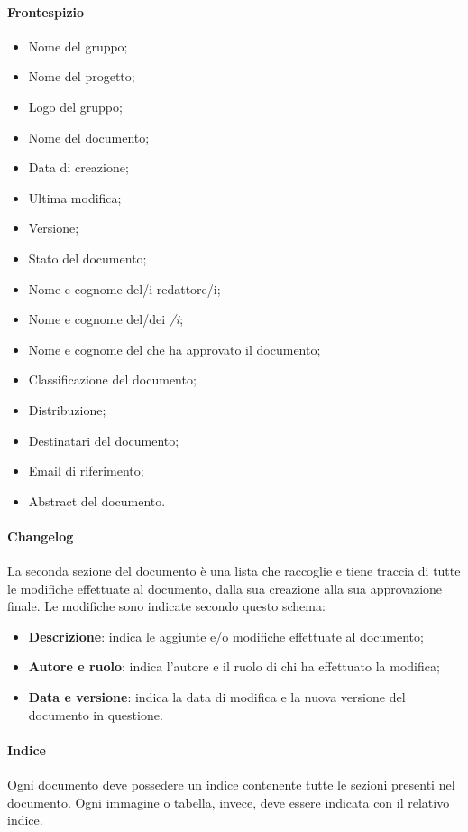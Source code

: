 			\paragraph{Frontespizio}
			\begin{itemize}
				\item{Nome del gruppo;}
				\item{Nome del progetto;}
				\item{Logo del gruppo;}
				\item{Nome del documento;}
				\item{Data di creazione;}
				\item{Ultima modifica;}
				\item{Versione;}
				\item{Stato del documento;}
				\item{Nome e cognome del/i redattore/i;}
				\item{Nome e cognome del/dei \textit{\Ver/i};}
				\item{Nome e cognome del \textit{\RdP} che ha approvato il documento;}
				\item{Classificazione del documento;}
				\item{Distribuzione;}
				\item{Destinatari del documento;}
				\item{Email di riferimento;}
				\item{Abstract del documento.}
			\end{itemize}
	
			\paragraph{Changelog}
			La seconda sezione del documento è una lista che raccoglie e tiene traccia di tutte le modifiche effettuate al documento, dalla sua creazione alla sua approvazione finale. Le modifiche sono indicate secondo questo schema:
			\begin{itemize}
				\item\textbf{Descrizione}: indica le aggiunte e/o modifiche effettuate al documento;
				\item\textbf{Autore e ruolo}: indica l’autore e il ruolo di chi ha effettuato la modifica;
				\item\textbf{Data e versione}: indica la data di modifica e la nuova versione del documento in questione.
			\end{itemize}	

			\paragraph{Indice}
			Ogni documento deve possedere un indice contenente tutte le sezioni presenti nel documento. Ogni immagine o tabella, invece, deve essere indicata con il relativo indice.

